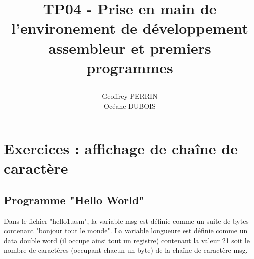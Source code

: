 \documentclass[11pt]{report}
\title{\textbf{TP04 - Prise en main de l'environement de développement assembleur et premiers programmes }
\author{Geoffrey PERRIN \\ Océane DUBOIS\\}
\date{}}
\begin{document}
\maketitle

\newpage

\section{Exercices : affichage de chaîne de caractère}

\subsection{Programme "Hello World"}

Dans le fichier "hello1.asm", la variable msg est définie comme un suite de bytes contenant "bonjour tout le monde".
La variable longueure est définie comme un data double word (il occupe ainsi tout un registre) contenant la valeur 21 soit le nombre de caractères (occupant chacun un byte) de la chaîne de caractère msg.
\end{document}
